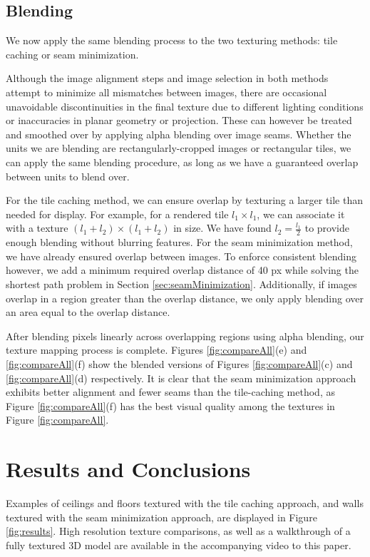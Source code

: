 \documentclass[]{spie}  %
\begin{document}
\subsection{Blending}
\label{sec:blending}
We now apply the same blending process to the two texturing methods:
tile caching or seam minimization.

Although the image alignment steps and image selection in both methods
attempt to minimize all mismatches between images, there are
occasional unavoidable discontinuities in the final texture due to
different lighting conditions or inaccuracies in planar geometry or
projection. These can however be treated and smoothed over by applying
alpha blending over image seams.  Whether the units we are blending
are rectangularly-cropped images or rectangular tiles, we can apply
the same blending procedure, as long as we have a guaranteed overlap
between units to blend over.

For the tile caching method, we can ensure overlap by texturing a
larger tile than needed for display. For example, for a rendered tile
$l_1 \times l_1$, we can associate it with a texture $(l_1 + l_2)
\times (l_1 + l_2)$ in size.  We have found $l_2 = \frac{l_1}{2}$ to
provide enough blending without blurring features. For the seam
minimization method, we have already ensured overlap between
images. To enforce consistent blending however, we add a minimum
required overlap distance of 40 px while solving the shortest path
problem in Section \ref{sec:seamMinimization}. Additionally, if images
overlap in a region greater than the overlap distance, we only apply
blending over an area equal to the overlap distance.

After blending pixels linearly across overlapping regions using alpha
blending, our texture mapping process is complete. Figures
\ref{fig:compareAll}(e) and \ref{fig:compareAll}(f) show the blended
versions of Figures \ref{fig:compareAll}(c) and
\ref{fig:compareAll}(d) respectively. It is clear that the seam
minimization approach exhibits better alignment and fewer seams
than the tile-caching method, as Figure \ref{fig:compareAll}(f) has
the best visual quality among the textures in Figure
\ref{fig:compareAll}.

\section{Results and Conclusions}
\label{sec:resultsAndConclusions}
Examples of ceilings and floors textured with the tile caching
approach, and walls textured with the seam minimization approach, are
displayed in Figure \ref{fig:results}. High resolution texture
comparisons, as well as a walkthrough of a fully textured 3D model are
available in the accompanying video to this paper.
\end{document}
